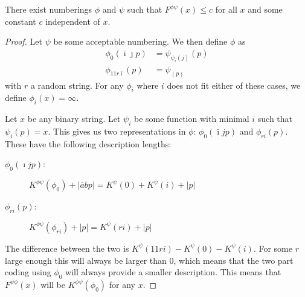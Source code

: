 \documentclass{style/llncs}
\begin{document}
\begin{lemma}
There exist numberings $\phi$ and $\psi$ such that $F^{\phi\psi}(x) \leq c$ for all $x$ and some constant $c$ independent of $x$. \label{lemma:constant}
\end{lemma}
\begin{proof}
Let $\psi$ be some acceptable numbering. We then define $\phi$ as
\begin{align*}
\phi_0(\bar\imath\jmath p) &= \psi_{\psi_i(j)}(p) \\
\phi_{11r\bar\imath}(p) &= \psi_(p)
\end{align*}
with $r$ a random string. For any $\phi_i$ where $i$ does not fit either of these cases, we define $\phi_i(x) = \infty$. 

Let $x$ be any binary string. Let $\psi_i$ be some function with minimal $i$ such that $\psi_i(p) = x$. This gives us two representations in $\phi$: $\phi_0(\bar\imath j p)$ and $\phi_{ri}(p)$. These have the following description lengths:

\begin{description}
\item[$\phi_0(\imath j p)$:] $K^{\phi\psi}(\phi_0) + |\overline{a}bp| = K^\psi(0) + K^\psi(i) + |p|$
\item[$\phi_{ri}(p)$:] $K^{\phi\psi}(\phi_{ri}) + |p| = K^{\psi}(ri) + |p|$
\end{description}

The difference between the two is $K^{\psi}(11ri) - K^\psi(0) - K^\psi(i)$. For some $r$ large enough this will always be larger than $0$, which means that the two part coding using $\phi_0$ will always provide a smaller description. 
This means that $F^{\psi\phi}(x)$ will be $K^{\phi\psi}(\phi_0)$ for any $x$.
\end{proof}
\end{document}
